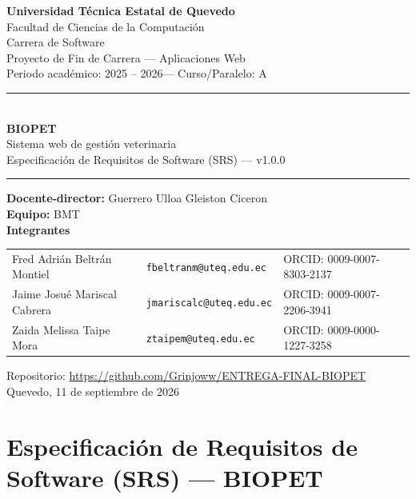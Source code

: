 \documentclass[
  spanish,
]{article}
\author{}
\date{}
\newcommand{\universidad}{Universidad T\'ecnica Estatal de Quevedo}
\newcommand{\facultad}{Facultad de Ciencias de la Computaci\'on}
\newcommand{\carrera}{Carrera de Software}
\newcommand{\asignatura}{Aplicaciones Web}
\newcommand{\docente}{Guerrero Ulloa Gleiston Ciceron}
\newcommand{\periodoacademico}{2025 -- 2026}
\newcommand{\cursoparalelo}{A}
\newcommand{\equipo}{BMT}
\newcommand{\ciudadfecha}{Quevedo, 11 de septiembre de 2026}
\begin{document}
\begin{titlepage}
\centering
\vspace*{0.6cm}
{\LARGE\bfseries \universidad \\[0.5cm]}
{\Large \facultad \\[0.2cm]}
{\large \carrera \\[0.2cm]}
{\large Proyecto de Fin de Carrera --- \asignatura \\[0.3cm]}
{\large Periodo acad\'emico: \periodoacademico \quad --- \quad Curso/Paralelo:
\cursoparalelo \\[1.2cm]}
\rule{\linewidth}{0.8pt}\\[0.4cm]
{\Huge\bfseries BIOPET \\[0.35cm]}
{\LARGE Sistema web de gesti\'on veterinaria \\[0.4cm]}
{\Large Especificaci\'on de Requisitos de Software (SRS) --- v1.0.0 \\[0.3cm]}
\rule{\linewidth}{0.8pt}
\vspace{1cm}
{\large \textbf{Docente-director:} \docente \\[0.5cm]}
{\large \textbf{Equipo:} \equipo \\[0.8cm]}
{\large\bfseries Integrantes \\[0.35cm]}
{\small
\renewcommand{\arraystretch}{1.5}
\begin{tabular}{@{}>{\centering\arraybackslash}p{5.2cm}
                >{\centering\arraybackslash}p{4.2cm}
                >{\centering\arraybackslash}p{5.4cm}@{}}
  Fred Adri\'an Beltr\'an Montiel & \texttt{fbeltranm@uteq.edu.ec} &
  ORCID: 0009-0007-8303-2137 \\
  Jaime Josu\'e Mariscal Cabrera & \texttt{jmariscalc@uteq.edu.ec} &
  ORCID: 0009-0007-2206-3941 \\
  Zaida Melissa Taipe Mora & \texttt{ztaipem@uteq.edu.ec} &
  ORCID: 0009-0000-1227-3258 \\
\end{tabular}
}
\vspace{1.2cm}
{\large Repositorio: \url{https://github.com/Grinjoww/ENTREGA-FINAL-BIOPET}}
\vfill
{\large \ciudadfecha}
\end{titlepage}

{
\setcounter{tocdepth}{3}
\tableofcontents
}
\section{Especificación de Requisitos de Software (SRS) ---
BIOPET}\label{especificaciuxf3n-de-requisitos-de-software-srs-biopet}
\end{document}

